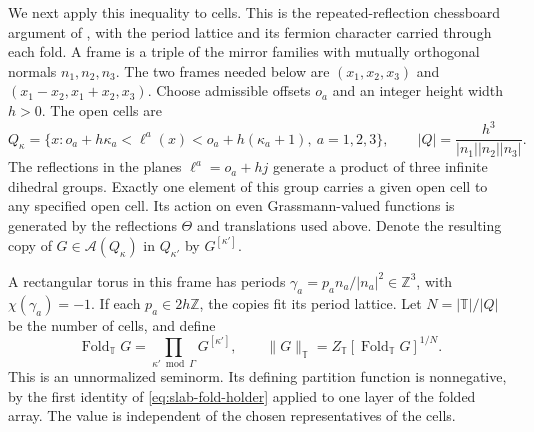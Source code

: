 \documentclass[11pt,letterpaper,reqno]{amsart}
\newcommand{\Z}{\mathbb Z}
\begin{document}
We next apply this inequality to cells. This is the repeated-reflection
chessboard argument of \cite[Section~4]{FILS1978}, with the period
lattice and its fermion character carried through each fold. A frame is a triple of the
mirror families with mutually orthogonal normals $n_1,n_2,n_3$.
The two frames needed below are $(x_1,x_2,x_3)$ and
$(x_1-x_2,x_1+x_2,x_3)$. Choose admissible offsets $o_a$ and an integer
height width $h>0$. The open cells are
\begin{equation}\label{eq:slab-cells}
 Q_\kappa=\{x:o_a+h\kappa_a<\ell^a(x)
                         <o_a+h(\kappa_a+1),\ a=1,2,3\},
 \qquad |Q|=\frac{h^3}{|n_1||n_2||n_3|}.
\end{equation}
The reflections in the planes $\ell^a=o_a+hj$ generate a product of
three infinite dihedral groups. Exactly one element of this group
carries a given open cell to any specified open cell. Its action on
even Grassmann-valued functions is generated by the reflections
$\Theta$ and translations used above. Denote the resulting copy of
$G\in\mathcal A(Q_\kappa)$ in $Q_{\kappa'}$ by $G^{[\kappa']}$.

A rectangular torus in this frame has periods
$\gamma_a=p_an_a/|n_a|^2\in\Z^3$, with $\chi(\gamma_a)=-1$.
If each $p_a\in2h\Z$, the copies fit its period lattice. Let
$N=|\mathbb T|/|Q|$ be the number of cells, and define
\begin{equation}\label{eq:slab-chessboard-norm}
 \operatorname{Fold}_{\mathbb T}G
          =\prod_{\kappa'\bmod\Gamma}G^{[\kappa']},
 \qquad \|G\|_{\mathbb T}
          =Z_{\mathbb T}[\operatorname{Fold}_{\mathbb T}G]^{1/N}.
\end{equation}
This is an unnormalized seminorm. Its defining partition function is
nonnegative, by the first identity of
\eqref{eq:slab-fold-holder} applied to one layer of the folded array.
The value is independent of the chosen representatives of the cells.
\end{document}
